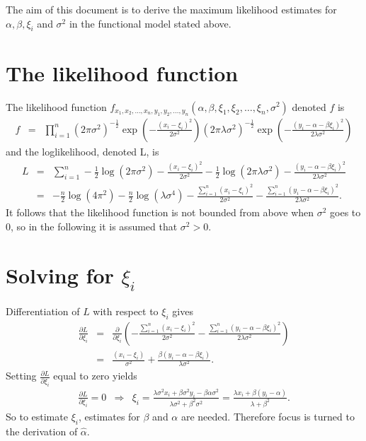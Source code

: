 \documentclass[a4paper,twoside,12pt]{article}
\begin{document}
The aim of this document is to derive the maximum
likelihood estimates for $\alpha, \beta, \xi_i$ and $\sigma^2$ in the functional model stated above.

\section{The likelihood function}
The likelihood function
$f_{x_1,x_2,\ldots,x_n,y_1,y_2,\ldots,y_n}(\alpha,\beta,\xi_1,\xi_2,\ldots,\xi_n,\sigma^2)$
denoted $f$ is
\begin{eqnarray*}
f
&=&
\prod_{i=1}^n
\left(2\pi\sigma^2\right)^{-\frac{1}{2}}\exp\left(-\frac{(x_i-\xi_i)^2}{2\sigma^2}\right)
\left(2\pi\lambda\sigma^2\right)^{-\frac{1}{2}}\exp\left(-\frac{(y_i-\alpha-\beta\xi_i)^2}{2\lambda\sigma^2}\right)
\end{eqnarray*}
and the loglikelihood, denoted L, is
\begin{eqnarray*}
L
&=&
\sum_{i=1}^n
-\frac{1}{2}\log\left(2\pi\sigma^2\right)-\frac{(x_i-\xi_i)^2}{2\sigma^2}-\frac{1}{2}\log\left(2\pi\lambda\sigma^2\right)-\frac{(y_i-\alpha-\beta\xi_i)^2}{2\lambda\sigma^2}\\[1em]
&=&
-\frac{n}{2}\log\left(4\pi^2\right)-\frac{n}{2}\log\left(\lambda\sigma^4\right)
-\frac{\sum_{i=1}^n(x_i-\xi_i)^2}{2\sigma^2}-\frac{\sum_{i=1}^n(y_i-\alpha-\beta\xi_i)^2}{2\lambda\sigma^2}.
\end{eqnarray*}
It follows that the likelihood function is not bounded from above when $\sigma^2$ goes to $0$, so in the following it is assumed that $\sigma^2>0$.

\section{Solving for $\xi_i$}
Differentiation of $L$ with respect to $\xi_i$ gives
\begin{eqnarray*}
\frac{\partial L}{\partial \xi_i}
&=&
\frac{\partial}{\partial
  \xi_i}\left(-\frac{\sum_{i=1}^n(x_i-\xi_i)^2}{2\sigma^2}-\frac{\sum_{i=1}^n(y_i-\alpha-\beta\xi_i)^2}{2\lambda\sigma^2}\right)\\[1em]
&=&
\frac{(x_i-\xi_i)}{\sigma^2}+\frac{\beta(y_i-\alpha-\beta\xi_i)}{\lambda\sigma^2}.
\end{eqnarray*}
Setting $\frac{\partial L}{\partial \xi_i}$ equal to zero yields
\begin{eqnarray}\label{xi}
\frac{\partial L}{\partial \xi_i}=0
&\Rightarrow&
\xi_i=\frac{\lambda\sigma^2x_i+\beta\sigma^2y_i-\beta\alpha\sigma^2}{\lambda\sigma^2+\beta^2\sigma^2}=\frac{\lambda
  x_i+\beta(y_i-\alpha)}{\lambda+\beta^2}.
\end{eqnarray}
So to estimate $\xi_i$, estimates for $\beta$ and $\alpha$ are needed. Therefore focus is turned to the derivation of $\hat{\alpha}$.
\end{document}
